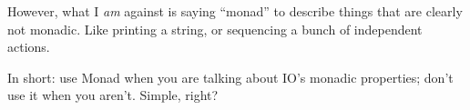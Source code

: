 \documentclass[]{article}
\begin{document}
\begin{itemize}
  However, what I \emph{am} against is saying ``monad'' to describe
  things that are clearly not monadic. Like printing a string, or
  sequencing a bunch of independent actions.

  In short: use Monad when you are talking about IO's monadic
  properties; don't use it when you aren't. Simple, right?
\end{itemize}
\end{document}
